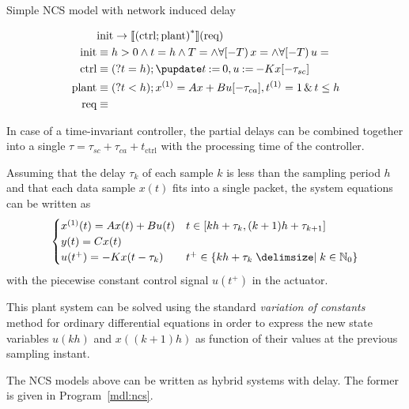         \begin{algorithm}[b]
            \caption{Simple NCS model with network induced delay}
            \label{mdl:ncs} %
            \begin{align*}
                &\init \limply \dbox{\hrepeat{(\ctrl;\plant)}}{(\req)}\\
                \init &\equiv h>0\land t=h\land T=\land \hs{x=}\land \hs{u=}\\
                \ctrl &\equiv (\htest{t=h}); \hupdate{\humod{t}{0},\humod{u}{-K\x[-\tau_{sc}]}}\\
                \plant &\equiv (\htest{t<h}); \hevolvein{\D{x}=Ax+Bu[-\tau_{ca}]\syssep \D{t}=1}{t\leq h}\\
                \req &\equiv
            \end{align*}
        \end{algorithm}

        In case of a time-invariant controller, the partial delays can be combined together into a single $\tau=\tau_{sc}+\tau_{ca}+t_{\text{ctrl}}$ with the processing time of the controller.

        Assuming that the delay $\tau_k$ of each sample $k$ is less than the sampling period $h$ and that each data sample $x(t)$ fits into a single packet, the system equations can be written as
        \begin{equation*}
            \begin{cases}
                \D{x}(t) = Ax(t) + Bu(t) &
                t\in\compactum{kh+\tau_k}{(k+1)h+\tau_{k+1}}\\
                y(t) = Cx(t) &\\
                u(t^+) = -Kx(t-\tau_k) &
                t^+\in\set{kh+\tau_k\with k\in\N_0}
            \end{cases}
        \end{equation*}
        with the piecewise constant control signal $u(t^+)$ in the actuator.

        This plant system can be solved using the standard \emph{variation of constants} method for ordinary differential equations in order to express the new state variables $u(kh)$ and $x((k+1)h)$ as function of their values at the previous sampling instant.

        The NCS models above can be written as hybrid systems with delay.
        The former is given in Program~\ref{mdl:ncs}.

